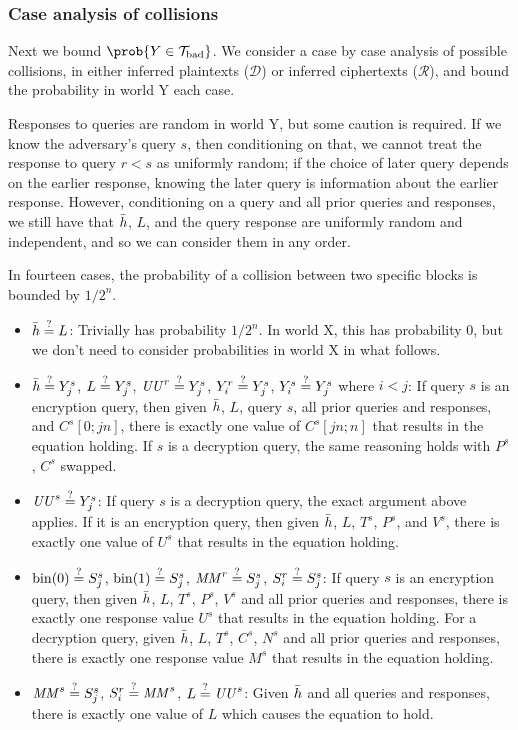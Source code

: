 \documentclass[hctr2.tex]{subfiles}
\begin{document}
\subsubsection{Case analysis of collisions}
Next we bound \(\prob{Y \in \Tb}\).
We consider a case by case analysis of possible collisions,
in either inferred plaintexts (\(\mathcal{D}\))
or inferred ciphertexts (\(\mathcal{R}\)),
and bound the probability in world Y each case.

Responses to queries are random in world Y,
but some caution is required.
If we know the adversary's query \(s\), then conditioning on that,
we cannot treat the response to query \(r < s\) as uniformly random;
if the choice of later query depends on the earlier response,
knowing the later query is information about the earlier response.
However, conditioning on a query and all prior queries and responses,
we still have that \(\bar{h}\), \(L\), and the
query response are uniformly random and independent,
and so we can consider them in any order.

In fourteen cases, the probability of a collision
between two specific blocks is bounded by \(1/2^n\).


\begin{itemize}
    \item \(\bar{h} \stackrel{\text{?}}{=} L\):
    Trivially has probability \(1/2^n\).
    In world X, this has probability 0,
    but we don't need to consider probabilities in world X
    in what follows.
    \item
    \(\bar{h} \stackrel{\text{?}}{=} Y_j^s\),
    \(L \stackrel{\text{?}}{=} Y_j^s\),
    \(\mathit{UU}^r \stackrel{\text{?}}{=} Y_j^s\),
    \(Y_i^r \stackrel{\text{?}}{=} Y_j^s\),
    \(Y_i^s \stackrel{\text{?}}{=} Y_j^s\) where \(i < j\): 
    If query \(s\) is an encryption query,
    then given \(\bar{h}\), \(L\), query \(s\), 
    all prior queries and responses, and
    \(C^s[0;jn]\), there is exactly one value of
    \(C^s[jn;n]\) that results in the equation holding.
    If \(s\) is a decryption query, the same reasoning holds
    with \(P^s\), \(C^s\) swapped.
    \item 
    \(\mathit{UU}^s \stackrel{\text{?}}{=} Y_j^s\):
    If query \(s\) is a decryption query,
    the exact argument above applies.
    If it is an encryption query,
    then given \(\bar{h}\), \(L\), \(T^s\), \(P^s\),
    and \(V^s\), there is exactly
    one value of \(U^s\) that results
    in the equation holding.
    \item 
    \(\operatorname{bin}(0) \stackrel{\text{?}}{=} S_j^s\),
    \(\operatorname{bin}(1) \stackrel{\text{?}}{=} S_j^s\),
    \(\mathit{MM}^r \stackrel{\text{?}}{=} S_j^s\),
    \(S_i^r \stackrel{\text{?}}{=} S_j^s\):
    If query \(s\) is an encryption query,
    then given \(\bar{h}\), \(L\), \(T^s\),
    \(P^s\), \(V^s\)
    and all prior queries and responses,
    there is exactly one response value \(U^s\)
    that results in the equation holding.
    For a decryption query, 
    given \(\bar{h}\), \(L\), \(T^s\),
    \(C^s\), \(N^s\)
    and all prior queries and responses,
    there is exactly one response value \(M^s\)
    that results in the equation holding.
    \item
    \(\mathit{MM}^s \stackrel{\text{?}}{=} S_j^s\),
    \(S_i^r \stackrel{\text{?}}{=} \mathit{MM}^s\),
    \(L \stackrel{\text{?}}{=} \mathit{UU}^s\):
    Given \(\bar{h}\) and all queries and responses,
    there is exactly one value of \(L\)
    which causes the equation to hold.
\end{itemize}
\end{document}
